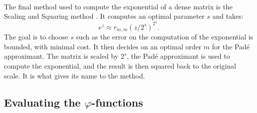       \paragraph{}
      The final method used to compute the exponential of a dense matrix is the Scaling and Squaring method \cite{Higham2009}.
      It computes an optimal parameter $s$ and takes:
      \begin{equation}
        e^z \approx r_{m,m}\left(z/2^s\right)^{2^s} .
      \end{equation}
      The goal is to choose $s$ such as the error on the computation of the exponential is bounded, with minimal cost.
      It then decides on an optimal order $m$ for the Padé approximant.
      The matrix is scaled by $2^s$, the Padé approximant is used to compute the exponential, and the result is then squared back to the original scale.
      It is what gives its name to the method.


    \subsection{Evaluating the \texorpdfstring{$\varphi$}{phi}-functions}

